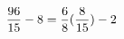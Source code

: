 \documentclass[preview]{standalone}
\begin{document}
\begin{align*}
\special{dvisvgm:raw <g id='unique000'>}\frac{96}{15} - 8 = \frac{6}{8} (\frac{8}{15}) - 2\special{dvisvgm:raw </g>}
\end{align*}
\end{document}

